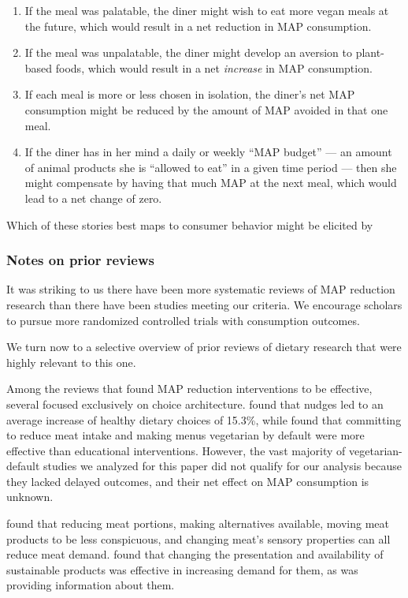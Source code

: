 \documentclass[sn-nature,referee,pdflatex]{sn-jnl}
\providecommand{\tightlist}{%
  \setlength{\itemsep}{0pt}\setlength{\parskip}{0pt}}
\begin{document}
\begin{enumerate}
\def\labelenumi{\arabic{enumi}.}
\tightlist
\item
  If the meal was palatable, the diner might wish to eat more vegan
  meals at the future, which would result in a net reduction in MAP
  consumption.
\item
  If the meal was unpalatable, the diner might develop an aversion to
  plant-based foods, which would result in a net \emph{increase} in MAP
  consumption.
\item
  If each meal is more or less chosen in isolation, the diner's net MAP
  consumption might be reduced by the amount of MAP avoided in that one
  meal.
\item
  If the diner has in her mind a daily or weekly ``MAP budget'' --- an
  amount of animal products she is ``allowed to eat'' in a given time
  period --- then she might compensate by having that much MAP at the
  next meal, which would lead to a net change of zero.
\end{enumerate}

Which of these stories best maps to consumer behavior might be elicited
by

\subsubsection{Notes on prior reviews}\label{sec5.4.5}

It was striking to us there have been more systematic reviews of MAP
reduction research than there have been studies meeting our criteria. We
encourage scholars to pursue more randomized controlled trials with
consumption outcomes.

We turn now to a selective overview of prior reviews of dietary research
that were highly relevant to this one.

Among the reviews that found MAP reduction interventions to be
effective, several focused exclusively on choice architecture.
\citep{arno2016} found that nudges led to an average increase of healthy
dietary choices of 15.3\%, while \citep{byerly2018} found that
committing to reduce meat intake and making menus vegetarian by default
were more effective than educational interventions. However, the vast
majority of vegetarian-default studies we analyzed for this paper did
not qualify for our analysis because they lacked delayed outcomes, and
their net effect on MAP consumption is unknown.

\citep{bianchi2018restructuring} found that reducing meat portions,
making alternatives available, moving meat products to be less
conspicuous, and changing meat's sensory properties can all reduce meat
demand. \citep{pandey2023} found that changing the presentation and
availability of sustainable products was effective in increasing demand
for them, as was providing information about them.
\end{document}
